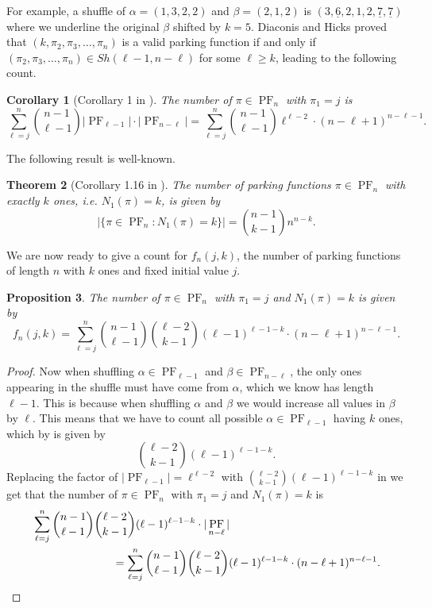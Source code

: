 \documentclass[12pt,reqno]{amsart}
\newtheorem{theorem}{Theorem}[section]
\newtheorem{corollary}[theorem]{Corollary}
\newtheorem{proposition}[theorem]{Proposition}
\theoremstyle{definition}
\theoremstyle{remark}
\DeclareMathOperator{\PF}{PF}
\begin{document}
For example, a shuffle of $\alpha=(1,3,2,2)$ and $\beta =(2,1,2)$ is 
$(3,\underline{6},2, 1, 2,\underline{7},\underline{7})$ where we underline the original $\beta$ shifted by $k=5$. 
Diaconis and Hicks \cite{diaconis2017probabilizing} proved that $(k, \pi_2,\pi_3,\ldots,\pi_n)$ is a valid parking function if and only if $(\pi_2,\pi_3,\ldots,\pi_n) \in Sh(\ell-1,n-\ell)$ for some $\ell\geq k$, leading to the following count.




\begin{corollary}[Corollary 1 in \cite{diaconis2017probabilizing}]\label{cor:PF with pi_1=j}
    The number of $\pi\in\PF_n$ with $\pi_1=j$ is
    \[\sum_{\ell=j}^{n}\binom{n-1}{\ell-1}|\PF_{\ell-1}|\cdot|\PF_{n-\ell}|=\sum_{\ell=j}^{n}\binom{n-1}{\ell-1}\ell^{\ell-2}\cdot(n-\ell+1)^{n-\ell-1}.\]
\end{corollary}

The following result is well-known. 

\begin{theorem}[Corollary 1.16 in \cite{yan2015parking}]\label{thm:PF with k ones}
The number of parking functions $\pi\in \PF_{n}$ with exactly $k$ ones, i.e. $N_1(\pi)=k$, is given by 
\[\bigl|\{\pi \in \PF_n: N_1(\pi)=k\}\bigr| = \binom{n-1}{k-1}n^{n-k}.\]
\end{theorem}

We are now ready to give a count for $f_n(j, k)$, the number of parking functions of length $n$ with $k$ ones and fixed initial value $j$.


\begin{proposition}\label{prop:f_n(j,k)_count}
    The number of $\pi\in\PF_n$ with $\pi_1=j$ and $N_1(\pi)=k$ is given by
    \begin{equation}\label{eq:f_n(j,k)}
        f_n(j,k)=\sum_{\ell=j}^n\binom{n-1}{\ell-1} \binom{\ell-2}{k-1}(\ell-1)^{\ell-1-k} \cdot (n-\ell+1)^{n-\ell-1}.
    \end{equation}
    
\end{proposition}
\begin{proof}
Now when shuffling $\alpha\in\PF_{\ell-1}$ and $\beta\in\PF_{n-\ell}$, the only ones appearing in the shuffle must have come from $\alpha$, which we know has length $\ell-1$. This is because when shuffling $\alpha$ and $\beta$ we would increase all values in $\beta$ by $\ell$. This means that we have to count all possible $\alpha\in\PF_{\ell-1}$ having  $k$ ones, which by  is given by 
\[\binom{\ell-2}{k-1}(\ell-1)^{\ell-1-k}.\]
Replacing the factor of $|\PF_{\ell-1}|=\ell^{\ell-2}$ with $\binom{\ell-2}{k-1}(\ell-1)^{\ell-1-k}$ in  we get that the number of $\pi\in\PF_{n}$ with $\pi_1=j$ and $N_1(\pi)=k$ is
    \begin{align*}
        &\sum_{\ell=j}^n\binom{n-1}{\ell-1} \binom{\ell-2}{k-1}(\ell-1)^{\ell-1-k} \cdot |\PF_{n-\ell}|\\
        &\hspace{1in}=\sum_{\ell=j}^n\binom{n-1}{\ell-1} \binom{\ell-2}{k-1}(\ell-1)^{\ell-1-k} \cdot (n-\ell+1)^{n-\ell-1}.\qedhere
    \end{align*}
\end{proof}
\end{document}
